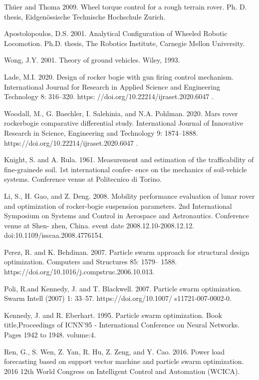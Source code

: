 \documentclass[default,iicol]{sn-jnl}
\theoremstyle{thmstyleone}
\theoremstyle{thmstyletwo}
\theoremstyle{thmstylethree}
\begin{document}
\begin{thebibliography}{99}
Th{\"{u}}er and Thoma 2009. Wheel torque control for a rough terrain rover. Ph. D. thesis, Eidgen{\"{o}}ssische Technische Hochschule Zurich.



Apostolopoulos, D.S. 2001. Analytical Configuration of Wheeled Robotic Locomotion. Ph.D.
thesis, The Robotics Institute, Carnegie Mellon 
University.
  

Wong, J.Y. 2001. Theory of ground vehicles. Wiley, 1993.

Lade, M.I. 2020. Design of rocker bogie with gun firing control mechanism. International Journal for Research in Applied Science
and Engineering Technology 8: 316–320. https: //doi.org/10.22214/ijraset.2020.6047 .


Woodall, M., G. Baechler, I. Salehinia, and N.A. Pohlman. 2020. Mars rover rockerbogie comparative differential study. International Journal of Innovative Research in Science, Engineering and Technology 9: 1874–1888. https://doi.org/10.22214/ijraset.2020.6047 .

Knight, S. and A. Rula. 1961. Measurement and estimation of the trafficability of fine-grainede soil. 1st international confer- ence on the mechanics of soil-vehicle systems. Conference venue at Politecnico di Torino.

 Li, S., H. Gao, and Z. Deng. 2008. Mobility performance evaluation of lunar rover and optimization of rocker-bogie suspension parameters. 2nd International Symposium on Systems and Control in Aerospace and Astronautics. Conference venue at Shen- zhen, China. event date 2008.12.10-2008.12.12. doi:10.1109/isscaa.2008.4776154.


Perez, R. and K. Behdinan. 2007. Particle swarm approach for structural design optimization. Computers and Structures 85: 1579– 1588. https://doi.org/10.1016/j.compstruc.2006.10.013.


Poli, R.and Kennedy, J. and T. Blackwell. 2007. Particle swarm optimization. Swarm Intell (2007) 1: 33–57. https://doi.org/10.1007/ s11721-007-0002-0.


Kennedy, J. and R. Eberhart. 1995. Particle swarm optimization. Book title,Proceedings of ICNN’95 - International Conference on Neural Networks. Pages 1942 to 1948. volume:4.


Ren, G., S. Wen, Z. Yan, R. Hu, Z. Zeng, and Y. Cao. 2016. Power load forecasting based on support vector machine and particle swarm optimization. 2016 12th World Congress on Intelligent Control and Automation (WCICA).



\end{thebibliography}
\end{document}
